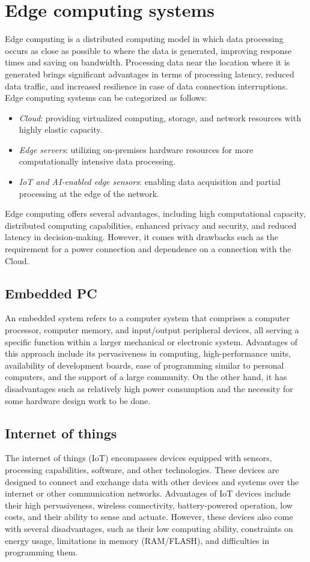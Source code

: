\section{Edge computing systems}

Edge computing is a distributed computing model in which data processing occurs as close as possible to where the data is generated, improving response times and saving on bandwidth. 
Processing data near the location where it is generated brings significant advantages in terms of processing latency, reduced data traffic, and increased resilience in case of data connection interruptions.
Edge computing systems can be categorized as follows:
\begin{itemize}
    \item \textit{Cloud}: providing virtualized computing, storage, and network resources with highly elastic capacity.
    \item \textit{Edge servers}: utilizing on-premises hardware resources for more computationally intensive data processing.
    \item \textit{IoT and AI-enabled edge sensors}: enabling data acquisition and partial processing at the edge of the network.
\end{itemize}
Edge computing offers several advantages, including high computational capacity, distributed computing capabilities, enhanced privacy and security, and reduced latency in decision-making. 
However, it comes with drawbacks such as the requirement for a power connection and dependence on a connection with the Cloud.

\subsection{Embedded PC}
An embedded system refers to a computer system that comprises a computer processor, computer memory, and input/output peripheral devices, all serving a specific function within a larger mechanical or electronic system.
Advantages of this approach include its pervasiveness in computing, high-performance units, availability of development boards, ease of programming similar to personal computers, and the support of a large community. 
On the other hand, it has disadvantages such as relatively high power consumption and the necessity for some hardware design work to be done.

\subsection{Internet of things}
The internet of things (IoT) encompasses devices equipped with sensors, processing capabilities, software, and other technologies. 
These devices are designed to connect and exchange data with other devices and systems over the internet or other communication networks.
Advantages of IoT devices include their high pervasiveness, wireless connectivity, battery-powered operation, low costs, and their ability to sense and actuate.
However, these devices also come with several disadvantages, such as their low computing ability, constraints on energy usage, limitations in memory (RAM/FLASH), and difficulties in programming them.